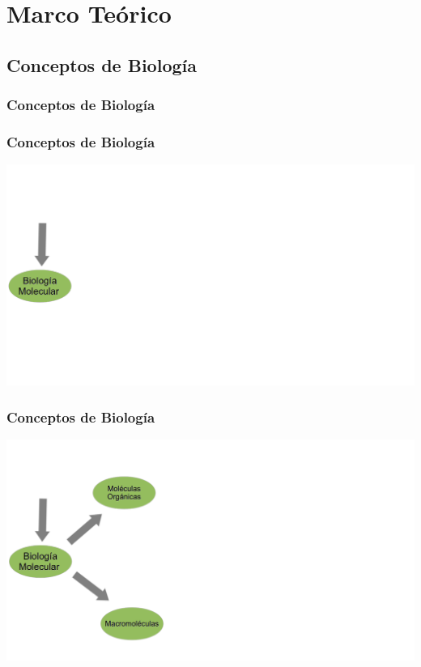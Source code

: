 \section{Marco Teórico}
  \subsection{Conceptos de Biología}

    \begin{frame}\frametitle{\textbf{Conceptos de Biología}}
    \end{frame}
    \begin{frame}\frametitle{\textbf{Conceptos de Biología}}
        \begin{center}
          \includegraphics[scale=.2]{images/biologia1.png}
        \end{center}
    \end{frame}

    \begin{frame}\frametitle{\textbf{Conceptos de Biología}}
        \begin{center}
          \includegraphics[scale=.2]{images/biologia2.png}
        \end{center}
    \end{frame}

